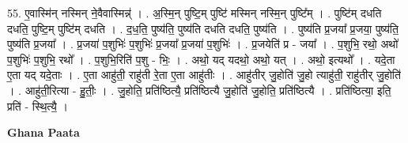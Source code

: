 \documentclass[17pt]{extarticle}
\begin{document}
55. ए॒वास्मि॑न् नस्मिन् ने॒वैवास्मिन्न्॑ । . अ॒स्मि॒न् पुष्टि॒म् पुष्टि॑ मस्मिन् नस्मि॒न् पुष्टि᳚म् । . पुष्टि॑म् दधति दधति॒ पुष्टि॒म् पुष्टि॑म् दधति । . द॒ध॒ति॒ पुष्य॑ति॒ पुष्य॑ति दधति दधति॒ पुष्य॑ति । . पुष्य॑ति प्र॒जया᳚ प्र॒जया॒ पुष्य॑ति॒ पुष्य॑ति प्र॒जया᳚ । . प्र॒जया॑ प॒शुभिः॑ प॒शुभिः॑ प्र॒जया᳚ प्र॒जया॑ प॒शुभिः॑ । . प्र॒जयेति॑ प्र - जया᳚ । . प॒शुभि॒ रथो॒ अथो॑ प॒शुभिः॑ प॒शुभि॒ रथो᳚ । . प॒शुभि॒रिति॑ प॒शु - भिः॒ । . अथो॒ यद् यदथो॒ अथो॒ यत् । . अथो॒ इत्यथो᳚ । . यदे॒ता ए॒ता यद् यदे॒ताः । . ए॒ता आहु॑ती॒ राहु॑ती रे॒ता ए॒ता आहु॑तीः । . आहु॑तीर् जु॒होति॑ जु॒हो त्याहु॑ती॒ राहु॑तीर् जु॒होति॑ । . आहु॑ती॒रित्या - हु॒तीः॒ । . जु॒होति॒ प्रति॑ष्ठित्यै॒ प्रति॑ष्ठित्यै जु॒होति॑ जु॒होति॒ प्रति॑ष्ठित्यै । . प्रति॑ष्ठित्या॒ इति॒ प्रति॑ - स्थि॒त्यै॒ । \newline

\textbf{Ghana Paata } \newline
\end{document}
